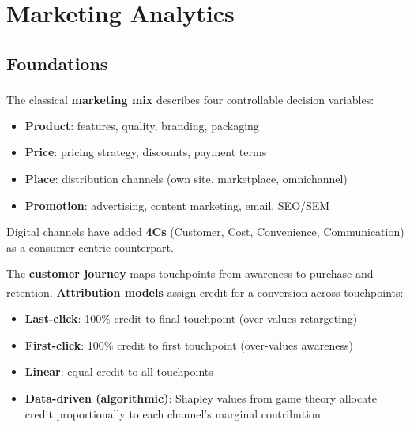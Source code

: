 \section{Marketing Analytics}

\subsection{Foundations}

\begin{tcbitemize}[ skin=sectionraster ]

    \tcbitem[title=Marketing Mix (4Ps), raster multicolumn=3]
    The classical \textbf{marketing mix} describes four controllable decision variables\textsuperscript{\cite[][pp.~18--24]{chaffeyDigitalBusinessECommerce2019}}:
    \begin{itemize}
        \item \textbf{Product}: features, quality, branding, packaging
        \item \textbf{Price}: pricing strategy, discounts, payment terms
        \item \textbf{Place}: distribution channels (own site, marketplace, omnichannel)
        \item \textbf{Promotion}: advertising, content marketing, email, SEO/SEM
    \end{itemize}
    Digital channels have added \textbf{4Cs} (Customer, Cost, Convenience, Communication) as a consumer-centric counterpart.

    \tcbitem[title=Customer Journey and Attribution, raster multicolumn=3]
    The \textbf{customer journey} maps touchpoints from awareness to purchase and retention\textsuperscript{\cite[][pp.~92--98]{chaffeyDigitalBusinessECommerce2019}}.
    \textbf{Attribution models} assign credit for a conversion across touchpoints:
    \begin{itemize}
        \item \textbf{Last-click}: 100\% credit to final touchpoint (over-values retargeting)
        \item \textbf{First-click}: 100\% credit to first touchpoint (over-values awareness)
        \item \textbf{Linear}: equal credit to all touchpoints
        \item \textbf{Data-driven (algorithmic)}: Shapley values from game theory allocate credit proportionally to each channel's marginal contribution
    \end{itemize}

\end{tcbitemize}

